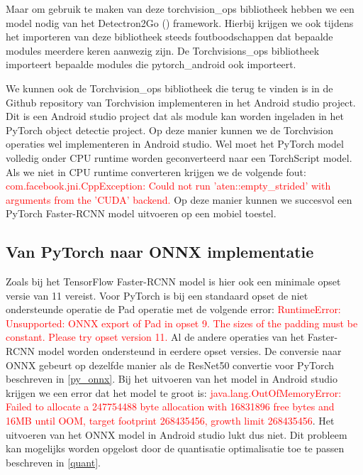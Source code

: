 Maar om gebruik te maken van deze torchvision\_ops bibliotheek hebben we een model nodig van het Detectron2Go (\cite{Facebook_detectron2_2021}) framework.
Hierbij krijgen we ook tijdens het importeren van deze bibliotheek steeds foutboodschappen dat bepaalde modules meerdere keren aanwezig zijn.
De Torchvisions\_ops bibliotheek importeert bepaalde modules die pytorch\_android ook importeert.

We kunnen ook de Torchvision\_ops bibliotheek die terug te vinden is in de Github repository van Torchvision implementeren in het Android studio project.
Dit is een Android studio project dat als module kan worden ingeladen in het PyTorch object detectie project.
Op deze manier kunnen we de Torchvision operaties wel implementeren in Android studio.
Wel moet het PyTorch model volledig onder CPU runtime worden geconverteerd naar een TorchScript model.
Als we niet in CPU runtime converteren krijgen we de volgende fout: \textcolor{red}{com.facebook.jni.CppException: Could not run 'aten::empty\_strided' with arguments from the 'CUDA' backend.}
\newline
Op deze manier kunnen we succesvol een PyTorch Faster-RCNN model uitvoeren op een mobiel toestel.




\subsection{Van PyTorch naar ONNX implementatie}
Zoals bij het TensorFlow Faster-RCNN model is hier ook een minimale opset versie van 11 vereist.
Voor PyTorch is bij een standaard opset de niet ondersteunde operatie de Pad operatie met de volgende error: 
\textcolor{red}{RuntimeError: Unsupported: ONNX export of Pad in opset 9. The sizes of the padding must be constant. Please try opset version 11.}
Al de andere operaties van het Faster-RCNN model worden ondersteund in eerdere opset versies.
De conversie naar ONNX gebeurt op dezelfde manier als de ResNet50 convertie voor PyTorch beschreven in \ref{py_onnx}.
Bij het uitvoeren van het model in Android studio krijgen we een error dat het model te groot is:
\textcolor{red}{java.lang.OutOfMemoryError: Failed to allocate a 247754488 byte allocation with 16831896 free bytes and 16MB until OOM, target footprint 268435456, growth limit 268435456}.
Het uitvoeren van het ONNX model in Android studio lukt dus niet.
Dit probleem kan mogelijks worden opgelost door de quantisatie optimalisatie toe te passen beschreven in \ref{quant}.

